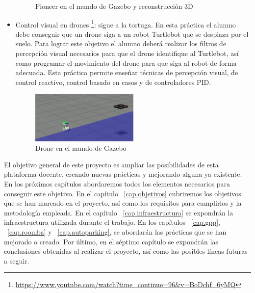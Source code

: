 \begin{itemize}
\begin{figure}[H]
\begin{center}
		\caption{Pioneer en el mundo de Gazebo y reconstrucción 3D}
		\label{fig.3D}
		\end{center}
\end{figure}
\item Control visual en drones \footnote{\url{https://www.youtube.com/watch?time_continue=96&v=BoDchf_6yMQ}}: sigue a la tortuga. En esta práctica el alumno debe conseguir que un drone siga a un robot Turtlebot que se desplaza por el suelo. Para lograr este objetivo el alumno deberá realizar los filtros de percepción visual necesarios para que el drone identifique al Turtlebot, así como programar el movimiento del drone para que siga al robot de forma adecuada. Esta práctica permite enseñar técnicas de percepción visual, de control reactivo, control basado en casos y de controladores PID.
\begin{figure}[H]
  \begin{center}
    \includegraphics[width=0.5\textwidth]{figures/Introduccion/Tortuga.png}
		\caption{Drone en el mundo de Gazebo}
		\label{fig.Tortuga}
		\end{center}
\end{figure}
\end{itemize}

El objetivo general de este proyecto es ampliar las posibilidades de esta plataforma docente, creando nuevas prácticas y mejorando alguna ya existente. En los próximos capítulos abordaremos todos los elementos necesarios para conseguir este objetivo. En el capítulo ~\ref{cap.objetivos} cubriremos los objetivos que se han marcado en el proyecto, así como los requisitos para cumplirlos y la metodología empleada. En el capítulo ~\ref{cap.infraestructura} se expondrán la infraestructura utilizada durante el trabajo. En los capítulos ~\ref{cap.gpp}, ~\ref{cap.roomba} y ~\ref{cap.autoparking}, se abordarán las prácticas que se han mejorado o creado. Por último, en el séptimo capítulo se expondrán las conclusiones obtenidas al realizar el proyecto, así como las posibles líneas futuras a seguir.